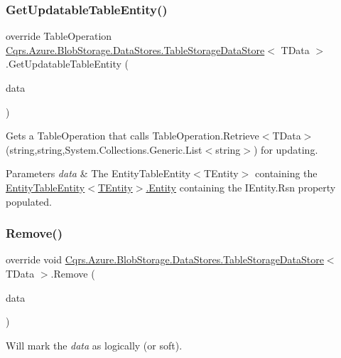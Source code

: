 \subsubsection{\texorpdfstring{Get\+Updatable\+Table\+Entity()}{GetUpdatableTableEntity()}\hspace{0.1cm}{\footnotesize\ttfamily [2/2]}}
{\footnotesize\ttfamily override Table\+Operation \hyperlink{classCqrs_1_1Azure_1_1BlobStorage_1_1DataStores_1_1TableStorageDataStore}{Cqrs.\+Azure.\+Blob\+Storage.\+Data\+Stores.\+Table\+Storage\+Data\+Store}$<$ T\+Data $>$.Get\+Updatable\+Table\+Entity (\begin{DoxyParamCaption}\item[{\hyperlink{classCqrs_1_1Azure_1_1BlobStorage_1_1EntityTableEntity}{Entity\+Table\+Entity}$<$ T\+Data $>$}]{data }\end{DoxyParamCaption})\hspace{0.3cm}{\ttfamily [protected]}}



Gets a Table\+Operation that calls Table\+Operation.\+Retrieve$<$\+T\+Data$>$(string,string,\+System.\+Collections.\+Generic.\+List$<$string$>$) for updating. 


\begin{DoxyParams}{Parameters}
{\em data} & The Entity\+Table\+Entity$<$\+T\+Entity$>$ containing the \hyperlink{classCqrs_1_1Azure_1_1BlobStorage_1_1EntityTableEntity_ac1f795a5b8c45645ebc71bcde126bcb5_ac1f795a5b8c45645ebc71bcde126bcb5}{Entity\+Table\+Entity$<$\+T\+Entity$>$.\+Entity} containing the I\+Entity.\+Rsn property populated.\\
\hline
\end{DoxyParams}
\mbox{\label{classCqrs_1_1Azure_1_1BlobStorage_1_1DataStores_1_1TableStorageDataStore_a724d1188cdac6a7bfe7c753480f0c09a_a724d1188cdac6a7bfe7c753480f0c09a}} 
\subsubsection{\texorpdfstring{Remove()}{Remove()}}
{\footnotesize\ttfamily override void \hyperlink{classCqrs_1_1Azure_1_1BlobStorage_1_1DataStores_1_1TableStorageDataStore}{Cqrs.\+Azure.\+Blob\+Storage.\+Data\+Stores.\+Table\+Storage\+Data\+Store}$<$ T\+Data $>$.Remove (\begin{DoxyParamCaption}\item[{T\+Data}]{data }\end{DoxyParamCaption})}



Will mark the {\itshape data}  as logically (or soft). 

